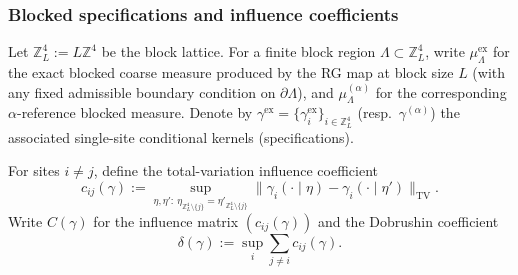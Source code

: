 \subsubsection{Blocked specifications and influence coefficients}

Let $\mathbb Z_L^4:=L\mathbb Z^4$ be the block lattice. For a finite block region $\Lambda\subset \mathbb Z_L^4$,
write $\mu_{\Lambda}^{\mathrm{ex}}$ for the exact blocked coarse measure produced by the RG map at block size $L$
(with any fixed admissible boundary condition on $\partial\Lambda$), and $\mu_{\Lambda}^{(\alpha)}$ for the corresponding
$\alpha$-reference blocked measure. Denote by $\gamma^{\mathrm{ex}}=\{\gamma_i^{\mathrm{ex}}\}_{i\in\mathbb Z_L^4}$
(resp.\ $\gamma^{(\alpha)}$) the associated single-site conditional kernels (specifications).

For sites $i\neq j$, define the total-variation influence coefficient
\[
c_{ij}(\gamma):=\sup_{\eta,\eta':\ \eta_{\mathbb Z_L^4\setminus\{j\}}=\eta'_{\mathbb Z_L^4\setminus\{j\}}}
\bigl\|\gamma_i(\cdot\mid \eta)-\gamma_i(\cdot\mid \eta')\bigr\|_{\mathrm{TV}}.
\]
Write $C(\gamma)$ for the influence matrix $(c_{ij}(\gamma))$ and the Dobrushin coefficient
\[
\delta(\gamma):=\sup_{i}\sum_{j\neq i} c_{ij}(\gamma).
\]

